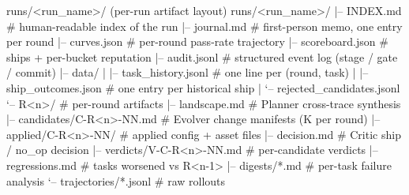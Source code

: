 \begin{promptfile}{runs/<run\_name>/ (per-run artifact layout)}
runs/<run_name>/
|-- INDEX.md            # human-readable index of the run
|-- journal.md          # first-person memo, one entry per round
|-- curves.json         # per-round pass-rate trajectory
|-- scoreboard.json     # ships + per-bucket reputation
|-- audit.jsonl         # structured event log (stage / gate / commit)
|-- data/
|   |-- task_history.jsonl      # one line per (round, task)
|   |-- ship_outcomes.json      # one entry per historical ship
|   `-- rejected_candidates.jsonl
`-- R<n>/                        # per-round artifacts
    |-- landscape.md             # Planner cross-trace synthesis
    |-- candidates/C-R<n>-NN.md  # Evolver change manifests (K per round)
    |-- applied/C-R<n>-NN/       # applied config + asset files
    |-- decision.md              # Critic ship / no_op decision
    |-- verdicts/V-C-R<n>-NN.md  # per-candidate verdicts
    |-- regressions.md           # tasks worsened vs R<n-1>
    |-- digests/*.md             # per-task failure analysis
    `-- trajectories/*.jsonl     # raw rollouts
\end{promptfile}

